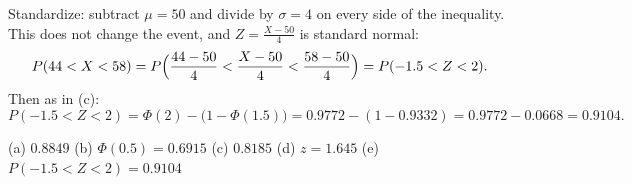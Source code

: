 \begin{solution}
	 Standardize: subtract $\mu=50$ and divide by $\sigma=4$ on
	every side of the inequality. This does not change the event, and
	$Z=\frac{X-50}{4}$ is standard normal:
	\[ P(44<X<58)=P\Bigl(\frac{44-50}{4}<\frac{X-50}{4}<\frac{58-50}{4}\Bigr)
		=P(-1.5<Z<2). \]
	Then as in (c):
	\[ P(-1.5<Z<2)=\Phi(2)-\bigl(1-\Phi(1.5)\bigr)=0.9772-(1-0.9332)
		=0.9772-0.0668=0.9104. \]

	\begin{answer}
		(a) $0.8849$ \quad
		(b) $\Phi(0.5)=0.6915$ \quad
		(c) $0.8185$ \quad
		(d) $z=1.645$ \quad
		(e) $P(-1.5<Z<2)=0.9104$
	\end{answer}
\end{solution}
